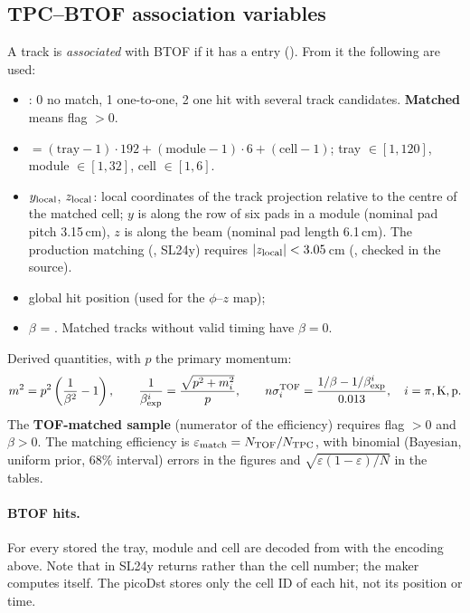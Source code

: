 \subsection{TPC--BTOF association variables}
\label{sec:tofdef}
A track is \emph{associated} with BTOF if it has a  entry
(). From it the following are used:
\begin{itemize}
\item {}: 0 no match, 1 one-to-one, 2 one hit with several track candidates.
  \textbf{Matched} means flag $>0$.
\item {} $=(\mathrm{tray}-1)\cdot192+(\mathrm{module}-1)\cdot6+(\mathrm{cell}-1)$;
  tray $\in[1,120]$, module $\in[1,32]$, cell $\in[1,6]$.
\item $y_{\rm local}$, $z_{\rm local}$: local coordinates of the track projection relative to the centre
  of the matched cell; $y$ is along the row of six pads in a module (nominal pad pitch 3.15\,cm),
  $z$ is along the beam (nominal pad length 6.1\,cm). The production matching
  (, SL24y) requires $|z_{\rm local}|<3.05$\,cm (, checked in the source).
\item global hit position  (used for the $\phi$--$z$ map);
\item $\beta$ = . Matched tracks without valid timing have $\beta=0$.
\end{itemize}
Derived quantities, with $p$ the primary momentum:
\begin{equation}
m^2 = p^2\left(\frac{1}{\beta^2}-1\right), \qquad
\frac{1}{\beta_{\rm exp}^{i}}=\frac{\sqrt{p^2+m_i^2}}{p}, \qquad
n\sigma^{\rm TOF}_i=\frac{1/\beta-1/\beta^{i}_{\rm exp}}{0.013}, \quad i=\pi,{\rm K},{\rm p}.
\end{equation}
The \textbf{TOF-matched sample} (numerator of the efficiency) requires flag $>0$ and $\beta>0$.
The matching efficiency is $\varepsilon_{\rm match}=N_{\rm TOF}/N_{\rm TPC}$, with binomial (Bayesian,
uniform prior, 68\% interval) errors in the figures and $\sqrt{\varepsilon(1-\varepsilon)/N}$ in the tables.


\paragraph{BTOF hits.} For every stored  the tray, module and cell are decoded
from  with the encoding above. Note that  in SL24y returns
 rather than the cell number; the maker computes  itself.
The picoDst stores only the cell ID of each hit, not its position or time.
